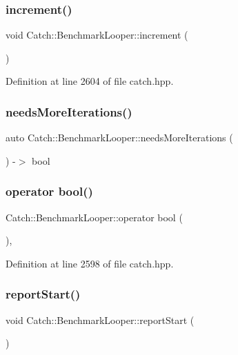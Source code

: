\subsubsection{increment()}
{\footnotesize\ttfamily void Catch\+::\+Benchmark\+Looper\+::increment (\begin{DoxyParamCaption}{ }\end{DoxyParamCaption})\hspace{0.3cm}{\ttfamily [inline]}}



Definition at line 2604 of file catch.\+hpp.

\mbox{\label{class_catch_1_1_benchmark_looper_a97bd944521f519b1593a5d1d2f9998fa}} 
\subsubsection{needsMoreIterations()}
{\footnotesize\ttfamily auto Catch\+::\+Benchmark\+Looper\+::needs\+More\+Iterations (\begin{DoxyParamCaption}{ }\end{DoxyParamCaption}) -\/$>$  bool}

\mbox{\label{class_catch_1_1_benchmark_looper_a54da41bada9da038dc05faf41d746765}} 
\subsubsection{operator bool()}
{\footnotesize\ttfamily Catch\+::\+Benchmark\+Looper\+::operator bool (\begin{DoxyParamCaption}{ }\end{DoxyParamCaption})\hspace{0.3cm}{\ttfamily [inline]}, {\ttfamily [explicit]}}



Definition at line 2598 of file catch.\+hpp.

\mbox{\label{class_catch_1_1_benchmark_looper_a0697d1b266112b110edf2025b82c4e77}} 
\subsubsection{reportStart()}
{\footnotesize\ttfamily void Catch\+::\+Benchmark\+Looper\+::report\+Start (\begin{DoxyParamCaption}{ }\end{DoxyParamCaption})}



